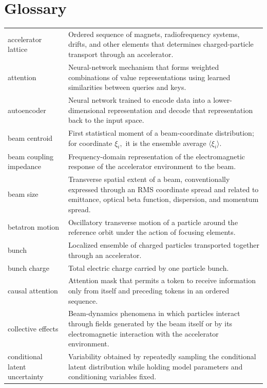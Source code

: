\chapter*{Glossary}
\begingroup
\setlength{\LTleft}{0.04936\textwidth}
\setlength{\LTright}{0pt}
\begin{longtable}{@{}p{}@{}p{}@{}}
accelerator lattice & Ordered sequence of magnets, radiofrequency systems, drifts, and other elements that determines charged-particle transport through an accelerator.\\
attention & Neural-network mechanism that forms weighted combinations of value representations using learned similarities between queries and keys.\\
autoencoder & Neural network trained to encode data into a lower-dimensional representation and decode that representation back to the input space.\\
\noalign{\vskip\baselineskip}
beam centroid & First statistical moment of a beam-coordinate distribution; for coordinate \(\xi_{i} ,\) it is the ensemble average \(\langle \xi_{i} \rangle .\)\\
beam coupling impedance & Frequency-domain representation of the electromagnetic response of the accelerator environment to the beam.\\
beam size & Transverse spatial extent of a beam, conventionally expressed through an RMS coordinate spread and related to emittance, optical beta function, dispersion, and momentum spread.\\
betatron motion & Oscillatory transverse motion of a particle around the reference orbit under the action of focusing elements.\\
bunch & Localized ensemble of charged particles transported together through an accelerator.\\
bunch charge & Total electric charge carried by one particle bunch.\\
\noalign{\vskip\baselineskip}
causal attention & Attention mask that permits a token to receive information only from itself and preceding tokens in an ordered sequence.\\
collective effects & Beam-dynamics phenomena in which particles interact through fields generated by the beam itself or by its electromagnetic interaction with the accelerator environment.\\
conditional latent uncertainty & Variability obtained by repeatedly sampling the conditional latent distribution while holding model parameters and conditioning variables fixed.\\

\end{longtable}
